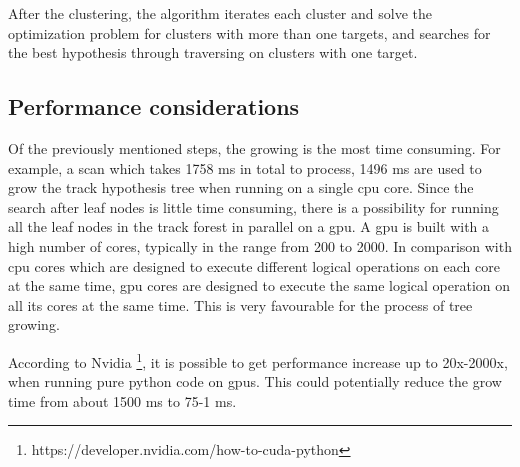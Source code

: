 After the clustering, the algorithm iterates each cluster and solve the optimization problem for clusters with more than one targets, and searches for the best hypothesis through traversing on clusters with one target.

\subsection{Performance considerations}
Of the previously mentioned steps, the growing is the most time consuming. For example, a scan which takes 1758 ms in total to process, 1496 ms are used to grow the \gls{track hypothesis tree} when running on a single \gls{cpu} core. Since the search after leaf nodes is little time consuming, there is a possibility for running all the leaf nodes in the track forest in parallel on a \gls{gpu}. A \gls{gpu} is built with a high number of cores, typically in the range from 200 to 2000. In comparison with \gls{cpu} cores which are designed to execute different logical operations on each core at the same time, \gls{gpu} cores are designed to execute the same logical operation on all its cores at the same time. This is very favourable for the process of tree growing.

According to Nvidia \footnote{https://developer.nvidia.com/how-to-cuda-python}, it is possible to get performance increase up to 20x-2000x, when running pure \Gls{python} code on \Glspl{gpu}. This could potentially reduce the grow time from about 1500 ms to 75-1 ms.